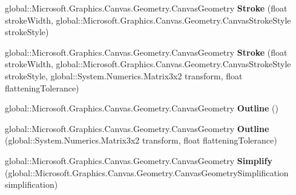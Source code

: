 \begin{DoxyCompactItemize}
\mbox{\label{interface_microsoft_1_1_graphics_1_1_canvas_1_1_geometry_1_1_i_canvas_geometry_a6ddac698f9eed90fcbbee6f511c98099}} 
global\+::\+Microsoft.\+Graphics.\+Canvas.\+Geometry.\+Canvas\+Geometry {\bfseries Stroke} (float stroke\+Width, global\+::\+Microsoft.\+Graphics.\+Canvas.\+Geometry.\+Canvas\+Stroke\+Style stroke\+Style)
\item 
\mbox{\label{interface_microsoft_1_1_graphics_1_1_canvas_1_1_geometry_1_1_i_canvas_geometry_ac124844233277683b138a1178fe818ad}} 
global\+::\+Microsoft.\+Graphics.\+Canvas.\+Geometry.\+Canvas\+Geometry {\bfseries Stroke} (float stroke\+Width, global\+::\+Microsoft.\+Graphics.\+Canvas.\+Geometry.\+Canvas\+Stroke\+Style stroke\+Style, global\+::\+System.\+Numerics.\+Matrix3x2 transform, float flattening\+Tolerance)
\item 
\mbox{\label{interface_microsoft_1_1_graphics_1_1_canvas_1_1_geometry_1_1_i_canvas_geometry_a7b1a716eb0cbfbd552347d14e00268b7}} 
global\+::\+Microsoft.\+Graphics.\+Canvas.\+Geometry.\+Canvas\+Geometry {\bfseries Outline} ()
\item 
\mbox{\label{interface_microsoft_1_1_graphics_1_1_canvas_1_1_geometry_1_1_i_canvas_geometry_ab685f87179af5eed5881feb2e4aa5c22}} 
global\+::\+Microsoft.\+Graphics.\+Canvas.\+Geometry.\+Canvas\+Geometry {\bfseries Outline} (global\+::\+System.\+Numerics.\+Matrix3x2 transform, float flattening\+Tolerance)
\item 
\mbox{\label{interface_microsoft_1_1_graphics_1_1_canvas_1_1_geometry_1_1_i_canvas_geometry_a1420c252e6995b540a402dc6d2088ff0}} 
global\+::\+Microsoft.\+Graphics.\+Canvas.\+Geometry.\+Canvas\+Geometry {\bfseries Simplify} (global\+::\+Microsoft.\+Graphics.\+Canvas.\+Geometry.\+Canvas\+Geometry\+Simplification simplification)
\item 
\mbox{\label{interface_microsoft_1_1_graphics_1_1_canvas_1_1_geometry_1_1_i_canvas_geometry_a4b3fad1c94d6807ac4628caa31ddcdfa}} 

\end{DoxyCompactItemize}
